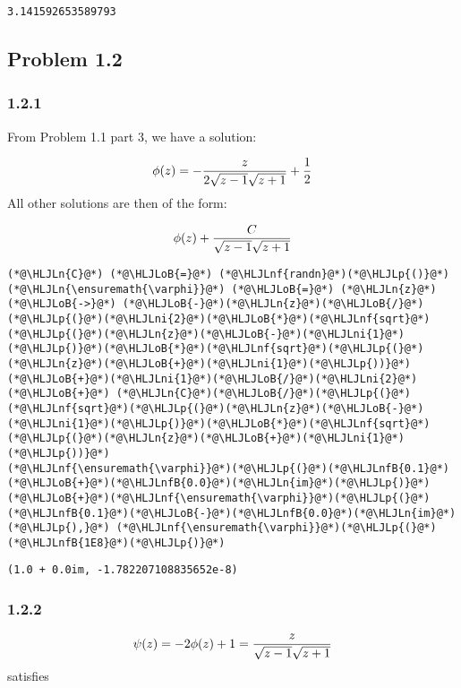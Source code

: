 \documentclass[12pt,landscape]{article}
\newcommand{\HLJLn}[1]{#1}
\newcommand{\HLJLnf}[1]{\textcolor[RGB]{66,102,213}{#1}}
\newcommand{\HLJLnfB}[1]{\textcolor[RGB]{59,151,46}{#1}}
\newcommand{\HLJLni}[1]{\textcolor[RGB]{59,151,46}{#1}}
\newcommand{\HLJLoB}[1]{\textcolor[RGB]{102,102,102}{\textbf{#1}}}
\newcommand{\HLJLp}[1]{#1}
\begin{document}
{\begin{lstlisting}
3.141592653589793
\end{lstlisting}
\newpage

\subsection{Problem 1.2}
\subsubsection{1.2.1}
From Problem 1.1 part 3, we have a solution:

\[
\phi(z) = -{ z  \over 2 \sqrt{z -1} \sqrt{z+1}} + {1 \over 2}
\]
All other solutions are then of the form:

\[
\phi(z) + {C \over \sqrt{z-1} \sqrt{z+1}}
\]

\begin{lstlisting}
(*@\HLJLn{C}@*) (*@\HLJLoB{=}@*) (*@\HLJLnf{randn}@*)(*@\HLJLp{()}@*)
(*@\HLJLn{\ensuremath{\varphi}}@*) (*@\HLJLoB{=}@*) (*@\HLJLn{z}@*) (*@\HLJLoB{->}@*) (*@\HLJLoB{-}@*)(*@\HLJLn{z}@*)(*@\HLJLoB{/}@*)(*@\HLJLp{(}@*)(*@\HLJLni{2}@*)(*@\HLJLoB{*}@*)(*@\HLJLnf{sqrt}@*)(*@\HLJLp{(}@*)(*@\HLJLn{z}@*)(*@\HLJLoB{-}@*)(*@\HLJLni{1}@*)(*@\HLJLp{)}@*)(*@\HLJLoB{*}@*)(*@\HLJLnf{sqrt}@*)(*@\HLJLp{(}@*)(*@\HLJLn{z}@*)(*@\HLJLoB{+}@*)(*@\HLJLni{1}@*)(*@\HLJLp{))}@*)(*@\HLJLoB{+}@*)(*@\HLJLni{1}@*)(*@\HLJLoB{/}@*)(*@\HLJLni{2}@*) (*@\HLJLoB{+}@*) (*@\HLJLn{C}@*)(*@\HLJLoB{/}@*)(*@\HLJLp{(}@*)(*@\HLJLnf{sqrt}@*)(*@\HLJLp{(}@*)(*@\HLJLn{z}@*)(*@\HLJLoB{-}@*)(*@\HLJLni{1}@*)(*@\HLJLp{)}@*)(*@\HLJLoB{*}@*)(*@\HLJLnf{sqrt}@*)(*@\HLJLp{(}@*)(*@\HLJLn{z}@*)(*@\HLJLoB{+}@*)(*@\HLJLni{1}@*)(*@\HLJLp{))}@*)
(*@\HLJLnf{\ensuremath{\varphi}}@*)(*@\HLJLp{(}@*)(*@\HLJLnfB{0.1}@*)(*@\HLJLoB{+}@*)(*@\HLJLnfB{0.0}@*)(*@\HLJLn{im}@*)(*@\HLJLp{)}@*)(*@\HLJLoB{+}@*)(*@\HLJLnf{\ensuremath{\varphi}}@*)(*@\HLJLp{(}@*)(*@\HLJLnfB{0.1}@*)(*@\HLJLoB{-}@*)(*@\HLJLnfB{0.0}@*)(*@\HLJLn{im}@*)(*@\HLJLp{),}@*) (*@\HLJLnf{\ensuremath{\varphi}}@*)(*@\HLJLp{(}@*)(*@\HLJLnfB{1E8}@*)(*@\HLJLp{)}@*)
\end{lstlisting}

\begin{lstlisting}
(1.0 + 0.0im, -1.782207108835652e-8)
\end{lstlisting}

\newpage
\subsubsection{1.2.2}
\[
\psi(z) = -2\phi(z) + 1 = { z  \over  \sqrt{z -1} \sqrt{z+1}}
\]
satisfies

}
\end{document}
